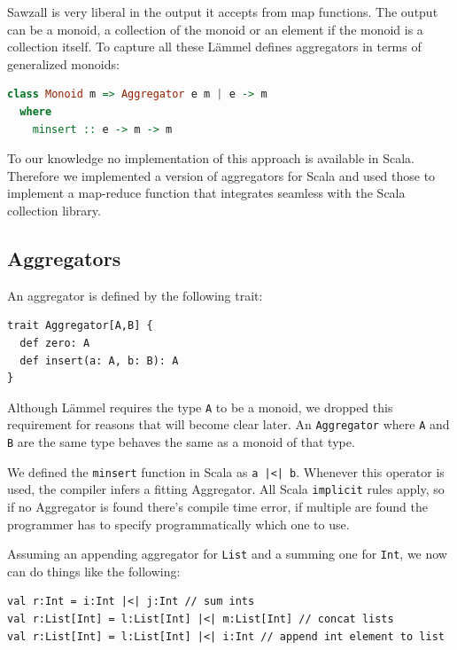 \documentclass[10pt,a4paper]{article}
\begin{document}
Sawzall is very liberal in the output it accepts from map functions. The output can be a monoid, a collection of the monoid or an element if the monoid is a collection itself. To capture all these L\"ammel defines aggregators in terms of generalized monoids:
\begin{lstlisting}[language=haskell]
class Monoid m => Aggregator e m | e -> m
  where
    minsert :: e -> m -> m
\end{lstlisting}

To our knowledge no implementation of this approach is available in Scala. Therefore we implemented a version of aggregators for Scala and used those to implement a map-reduce function that integrates seamless with the Scala collection library.

\subsection{Aggregators}

An aggregator is defined by the following trait:
\begin{lstlisting}
trait Aggregator[A,B] {
  def zero: A
  def insert(a: A, b: B): A
}
\end{lstlisting}
Although L\"ammel requires the type \lstinline|A| to be a monoid, we dropped this requirement for reasons that will become clear later. An \lstinline|Aggregator| where \lstinline|A| and \lstinline|B| are the same type behaves the same as a monoid of that type.

We defined the \lstinline[language=haskell]|minsert| function in Scala as \lstinline!a |<| b!. Whenever this operator is used, the compiler infers a fitting Aggregator. All Scala \lstinline|implicit| rules apply, so if no Aggregator is found there's compile time error, if multiple are found the programmer has to specify programmatically which one to use.

Assuming an appending aggregator for \lstinline|List| and a summing one for \lstinline|Int|, we now can do things like the following:
\begin{lstlisting}
val r:Int = i:Int |<| j:Int // sum ints
val r:List[Int] = l:List[Int] |<| m:List[Int] // concat lists
val r:List[Int] = l:List[Int] |<| i:Int // append int element to list
\end{lstlisting}
\end{document}
